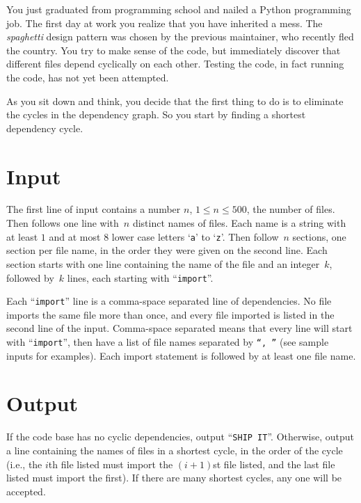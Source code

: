 
%
%
You just graduated from programming school and nailed a Python programming job.
The first day at work you realize that you have inherited a mess.  The
\emph{spaghetti} design pattern was chosen by the previous maintainer, who
recently fled the country.
%
You try to make sense of the code, but immediately discover that different files
depend cyclically on each other.  Testing the code, in fact running the code,
has not yet been attempted.

As you sit down and think, you decide that the first thing to do is to eliminate
the cycles in the dependency graph.  So you start by finding a shortest
dependency cycle.

\section*{Input}
The first line of input contains a number $n$, $1 \le n \le 500$, the number of files.  Then follows one line with~$n$ distinct names of files.  Each name is a string with at least $1$ and at most $8$ lower case letters `\texttt{a}' to `\texttt{z}'.
%
Then follow~$n$ sections, one section per file name, in the order they were
given on the second line.  Each section starts with one line containing the name of the
file and an integer~$k$, followed by~$k$ lines, each starting with ``\texttt{import}''.

Each ``\texttt{import}'' line is a comma-space separated line of dependencies.  No file
imports the same file more than once, and every file imported is listed in the
second line of the input.  Comma-space separated means that every line will
start with ``\texttt{import}'', then have a list of file names separated by \texttt{``, ''} (see sample inputs for examples).  Each import statement is followed by at least one file name.



\section*{Output}

If the code base has no cyclic dependencies, output ``\texttt{SHIP
IT}''.  Otherwise, output a line containing the names of files in a
shortest cycle, in the order of the cycle (i.e., the $i$th file listed must import the $(i+1)$st file listed, and the last file listed must import the first).  If there are many shortest
cycles, any one will be accepted.
